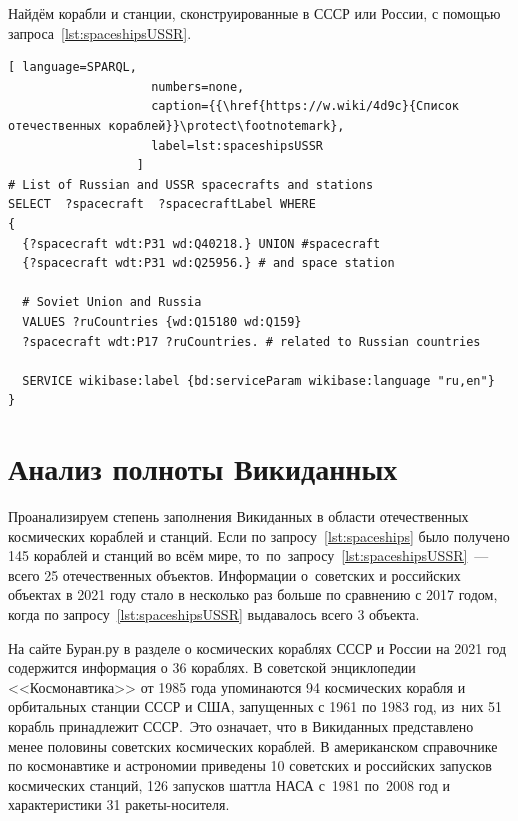 Найдём корабли и станции, сконструированные в СССР или России, 
с помощью запроса~\ref{lst:spaceshipsUSSR}.

\begin{lstlisting}[ language=SPARQL, 
                    numbers=none, 
                    caption={{\href{https://w.wiki/4d9c}{Список отечественных кораблей}}\protect\footnotemark}, 
                    label=lst:spaceshipsUSSR
                  ]
# List of Russian and USSR spacecrafts and stations
SELECT  ?spacecraft  ?spacecraftLabel WHERE
{
  {?spacecraft wdt:P31 wd:Q40218.} UNION #spacecraft
  {?spacecraft wdt:P31 wd:Q25956.} # and space station
  
  # Soviet Union and Russia
  VALUES ?ruCountries {wd:Q15180 wd:Q159}
  ?spacecraft wdt:P17 ?ruCountries. # related to Russian countries
  
  SERVICE wikibase:label {bd:serviceParam wikibase:language "ru,en"}
}
\end{lstlisting}



\section{Анализ полноты Викиданных}

Проанализируем степень заполнения Викиданных в области отечественных космических кораблей и станций. 
Если по запросу~\ref{lst:spaceships} было получено 145 кораблей и станций во всём мире, 
то~по~запросу~\ref{lst:spaceshipsUSSR}~--- всего 25 отечественных объектов. 
Информации о~советских и российских объектах в 2021 году 
стало в несколько раз больше по сравнению с 2017 годом, 
когда по запросу~\ref{lst:spaceshipsUSSR} выдавалось всего 3 объекта. 

На сайте Буран.ру в разделе о космических кораблях СССР и России на 2021 год 
содержится информация о 36 кораблях\autocite{spacecraftBuran}. 
В советской энциклопедии <<Космонавтика>> от 1985 года упоминаются 
94 космических корабля и орбитальных станции СССР и США, 
запущенных с 1961 по 1983 год, 
из~них 51 корабль принадлежит СССР\autocite[498]{spacecraftCosmonavtika}.\, 
Это означает, что в Викиданных представлено менее половины советских космических кораблей. 
В американском справочнике по космонавтике и астрономии 
приведены 10 советских и российских запусков космических станций, %
126 запусков шаттла НАСА с~1981 по~2008 год %
и характеристики 31 ракеты-носителя\autocite{spacecraftSAA}.   %




